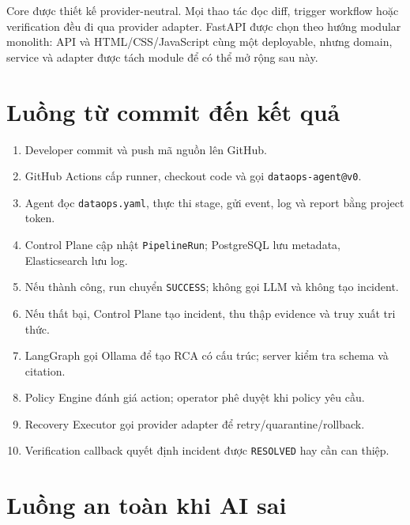 \documentclass[12pt,a4paper,oneside]{report}
\newcommand{\code}[1]{\texttt{#1}}
\begin{document}
Core được thiết kế provider-neutral. Mọi thao tác đọc diff, trigger workflow hoặc verification đều
đi qua provider adapter. FastAPI được chọn theo hướng modular monolith: API và HTML/CSS/JavaScript
cùng một deployable, nhưng domain, service và adapter được tách module để có thể mở rộng sau này.

\section{Luồng từ commit đến kết quả}

\begin{enumerate}
  \item Developer commit và push mã nguồn lên GitHub.
  \item GitHub Actions cấp runner, checkout code và gọi \code{dataops-agent@v0}.
  \item Agent đọc \code{dataops.yaml}, thực thi stage, gửi event, log và report bằng project token.
  \item Control Plane cập nhật \code{PipelineRun}; PostgreSQL lưu metadata, Elasticsearch lưu log.
  \item Nếu thành công, run chuyển \code{SUCCESS}; không gọi LLM và không tạo incident.
  \item Nếu thất bại, Control Plane tạo incident, thu thập evidence và truy xuất tri thức.
  \item LangGraph gọi Ollama để tạo RCA có cấu trúc; server kiểm tra schema và citation.
  \item Policy Engine đánh giá action; operator phê duyệt khi policy yêu cầu.
  \item Recovery Executor gọi provider adapter để retry/quarantine/rollback.
  \item Verification callback quyết định incident được \code{RESOLVED} hay cần can thiệp.
\end{enumerate}

\section{Luồng an toàn khi AI sai}
\end{document}
